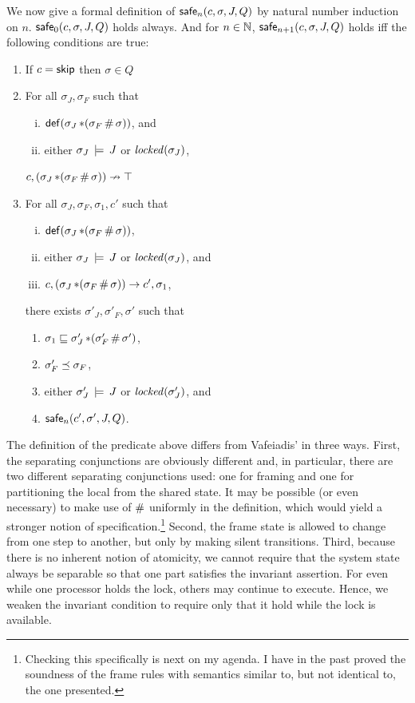 \documentclass[11pt]{article}
\begin{document}
We now give a formal definition of $\mathsf{safe}_{n}(c,\sigma,J,Q)$ by natural number induction on $n$. $\mathsf{safe}_{0}(c,\sigma,J,Q)$ holds always. And for $n \in \mathbb{N}$, $\mathsf{safe}_{n+1}(c,\sigma,J,Q)$ holds iff the following conditions are true: \begin{enumerate}
	\item If $c = \operatorname{\mathsf{skip}}$ then $\sigma \in Q$

	\item For all $\sigma_J,\sigma_F$ such that \begin{enumerate}[(i)]
		\item $\mathsf{def}(\sigma_J \operatorname{\ast} (\sigma_F \operatorname{\#} \sigma))$, and 
		\item either $\sigma_J \,\models\, J$ or $\mathit{locked}(\sigma_J)$,
	\end{enumerate} $c,(\sigma_J \operatorname{\ast} (\sigma_F \operatorname{\#} \sigma)) \nrightarrow \top$

	\item For all $\sigma_J,\sigma_F,\sigma_1,c'$ such that \begin{enumerate}[(i)]
		\item $\mathsf{def}(\sigma_J \operatorname{\ast} (\sigma_F \operatorname{\#} \sigma))$,
		\item either $\sigma_J \,\models\, J$ or $\mathit{locked}(\sigma_J)$, and 
		\item $c, (\sigma_J \operatorname{\ast} (\sigma_F \operatorname{\#} \sigma)) \rightarrow c',\sigma_1$,
	\end{enumerate} there exists $\sigma'_J,\sigma'_F,\sigma'$ such that \begin{enumerate}
		\item $\sigma_1 \sqsubseteq \sigma'_J \operatorname{\ast} (\sigma'_F \operatorname{\#} \sigma')$,
		\item $\sigma'_F \preceq \sigma_F$,
		\item either $\sigma'_J \,\models\, J$ or $\mathit{locked}(\sigma'_J)$, and
		\item $\mathsf{safe}_{n}(c',\sigma',J,Q)$.
	\end{enumerate}

\end{enumerate}

The definition of the predicate above differs from Vafeiadis' in three ways. First, the separating conjunctions are obviously different and, in particular, there are two different separating conjunctions used: one for framing and one for partitioning the local from the shared state. It may be possible (or even necessary) to make use of $\operatorname{\#}$ uniformly in the definition, which would yield a stronger notion of specification.\footnote{Checking this specifically is next on my agenda. I have in the past proved the soundness of the frame rules with semantics similar to, but not identical to, the one presented.} Second, the frame state is allowed to change from one step to another, but only by making silent transitions. Third, because there is no inherent notion of atomicity, we cannot require that the system state always be separable so that one part satisfies the invariant assertion. For even while one processor holds the lock, others may continue to execute. Hence, we weaken the invariant condition to require only that it hold while the lock is available.
\end{document}
